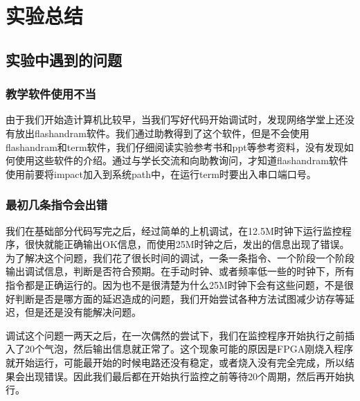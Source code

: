 
\chapter{实验总结} %

\label{Chapter6} %


\section{实验中遇到的问题}

\subsection{教学软件使用不当}

由于我们开始造计算机比较早，当我们写好代码开始调试时，发现网络学堂上还没有放出flashandram软件。我们通过助教得到了这个软件，但是不会使用flashandram和term软件，我们仔细阅读实验参考书和ppt等参考资料，没有发现如何使用这些软件的介绍。通过与学长交流和向助教询问，才知道flashandram软件使用前要将impact加入到系统path中，在运行term时要出入串口端口号。


\subsection{最初几条指令会出错}
我们在基础部分代码写完之后，经过简单的上机调试，在12.5M时钟下运行监控程序，很快就能正确输出OK信息，而使用25M时钟之后，发出的信息出现了错误。为了解决这个问题，我们花了很长时间的调试，一条一条指令、一个阶段一个阶段输出调试信息，判断是否符合预期。在手动时钟、或者频率低一些的时钟下，所有指令都是正确运行的。因为也不是很清楚为什么25M时钟下会有这些问题，不是很好判断是否是哪方面的延迟造成的问题，我们开始尝试各种方法试图减少访存等延迟，但是还是没有能解决问题。

调试这个问题一两天之后，在一次偶然的尝试下，我们在监控程序开始执行之前插入了20个气泡，然后输出信息就正常了。这个现象可能的原因是FPGA刚烧入程序就开始运行，可能最开始的时候电路还没有稳定，或者烧入没有完全完成，所以结果会出现错误。因此我们最后都在开始执行监控之前等待20个周期，然后再开始执行。

